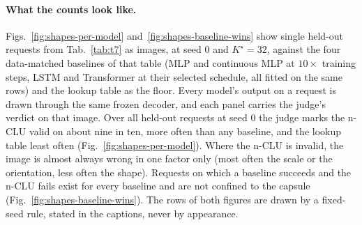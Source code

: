 \documentclass{article} %
\newcommand{\Kstar}{\ensuremath{K^{\star}}}
\begin{document}
\paragraph{What the counts look like.} Figs.~\ref{fig:shapes-per-model} and~\ref{fig:shapes-baseline-wins}
show single held-out requests from Tab.~\ref{tab:t7} as images, at seed 0 and $\Kstar=32$, against the %
four data-matched baselines of that table (MLP and continuous MLP at $10\times$ training steps, LSTM and
Transformer at their selected schedule, all fitted on the same rows) and the lookup table as the %
floor. Every model's output on a request is drawn through the same frozen decoder, and each panel
carries the judge's verdict on that image. Over all held-out requests at seed 0 the judge marks %
the n-CLU valid on about nine in ten, more often than any baseline, and the lookup table %
least often (Fig.~\ref{fig:shapes-per-model}). %
Where the n-CLU is invalid, the image is almost always wrong in one factor only %
(most often the scale or the orientation, less often the shape). %
Requests on which a baseline succeeds and the n-CLU fails exist for every baseline %
and are not confined to the capsule %
(Fig.~\ref{fig:shapes-baseline-wins}). %
The rows of both figures are drawn by a fixed-seed rule, stated in the captions, never by appearance.
\end{document}
